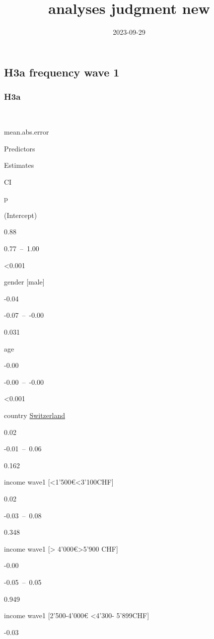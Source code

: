 \documentclass[
]{article}
\title{analyses judgment new}
\author{}
\date{\vspace{-2.5em}2023-09-29}
\begin{document}
\maketitle

{
\setcounter{tocdepth}{3}
\tableofcontents
}
\hypertarget{h3a-frequency-wave-1}{%
\subsection{H3a frequency wave 1}\label{h3a-frequency-wave-1}}

\hypertarget{h3a}{%
\subsubsection{H3a}\label{h3a}}

~

mean.abs.error

Predictors

Estimates

CI

p

(Intercept)

0.88

0.77~--~1.00

\textless0.001

gender {[}male{]}

-0.04

-0.07~--~-0.00

0.031

age

-0.00

-0.00~--~-0.00

\textless0.001

country \protect\hyperlink{switzerland}{Switzerland}

0.02

-0.01~--~0.06

0.162

income wave1 {[}\textless1'500€\textless3'100CHF{]}

0.02

-0.03~--~0.08

0.348

income wave1 {[}\textgreater{} 4'000€\textgreater5'900 CHF{]}

-0.00

-0.05~--~0.05

0.949

income wave1 {[}2'500-4'000€ \textless4'300- 5'899CHF{]}

-0.03
\end{document}
